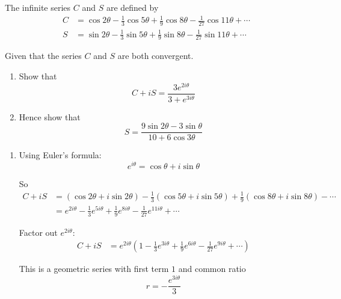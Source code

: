 \documentclass[leqno]{article}
\begin{document}
\djsFrontMatter
\begin{enumerate}[
  label=\textbf{\arabic*.},
  leftmargin=*,
  topsep=0pt,
  partopsep=0pt,
  parsep=0pt
]

\questionitem

The infinite series $C$ and $S$ are defined by
\begin{align*}
 C&= \cos 2\theta - \frac{1}{3}\cos 5\theta + \frac{1}{9}\cos 8\theta - \frac{1}{27}\cos 11\theta + \cdots \\[4pt]
S &= \sin 2\theta - \frac{1}{3}\sin 5\theta + \frac{1}{9}\sin 8\theta - \frac{1}{27}\sin 11\theta + \cdots  
\end{align*}

Given that the series $C$ and $S$ are both convergent. \\

\begin{enumerate}[label=\textbf{(\alph*)}]
  \item Show that
  \[
  C+ iS = \frac{3e^{2i\theta}}{3 + e^{3i\theta}}
  \]
  \item Hence show that
  \[
  S = \frac{9\sin 2\theta - 3\sin \theta}{10 + 6\cos 3\theta}
  \]
\end{enumerate}

\vspace*{10pt}

\begin{djsSolution}
\begin{enumerate}[label=\textbf{(\alph*)}]
  \item Using Euler's formula:
\[
e^{i\theta}=\cos\theta+i\sin\theta
\]

So
\begin{align*}
C+iS
&= \left(\cos 2\theta+i\sin 2\theta\right)
-\frac13\left(\cos 5\theta+i\sin 5\theta\right)
+\frac19\left(\cos 8\theta+i\sin 8\theta\right)-\cdots \\
&= e^{2i\theta}-\frac13 e^{5i\theta}+\frac19 e^{8i\theta}-\frac1{27}e^{11i\theta}+\cdots
\end{align*}

Factor out \(e^{2i\theta}\):
\begin{align*}
C+iS
&= e^{2i\theta}\left(1-\frac13 e^{3i\theta}+\frac19 e^{6i\theta}-\frac1{27}e^{9i\theta}+\cdots\right)
\end{align*}

This is a geometric series with first term \(1\) and common ratio
\[
r=-\frac{e^{3i\theta}}{3}
\]


\end{enumerate}
\end{djsSolution}
\end{enumerate}
\end{document}
